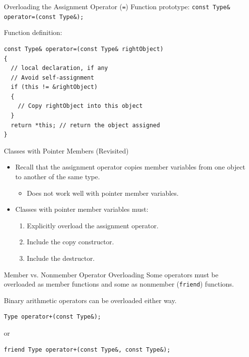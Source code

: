 \documentclass[14pt,aspectratio=1610, hyperref={pdfpagelayout=SinglePage}]{beamer}
\begin{document}
\begin{frame}[fragile]{Overloading the Assignment Operator (\texttt{=})}
\protect\hypertarget{overloading-the-assignment-operator}{}
  Function prototype:
  \lstinline{const Type& operator=(const Type&);}

  Function definition:
  \begin{lstlisting}[basicstyle=\ttfamily\small]
const Type& operator=(const Type& rightObject)
{
  // local declaration, if any
  // Avoid self-assignment
  if (this != &rightObject)
  {
    // Copy rightObject into this object
  }
  return *this; // return the object assigned
}\end{lstlisting}

\end{frame}

\begin{frame}{Classes with Pointer Members (Revisited)}
\begin{itemize}
\item
  Recall that the assignment operator copies member variables from one
  object to another of the same type.
  \begin{itemize}
  \item
    Does not work well with pointer member variables.
  \end{itemize}
\item
  Classes with pointer member variables must:
  \begin{enumerate}
  \item
    Explicitly overload the assignment operator.
  \item
    Include the copy constructor.
  \item
    Include the destructor.
  \end{enumerate}
\end{itemize}
\end{frame}

\begin{frame}[fragile]{Member vs. Nonmember Operator Overloading}
Some operators must be overloaded as member functions and some as nonmember (\lstinline{friend}) functions.

Binary arithmetic operators can be overloaded either way.
  \begin{lstlisting}
Type operator+(const Type&);
\end{lstlisting}
  or
\begin{lstlisting}
friend Type operator+(const Type&, const Type&);
\end{lstlisting}
\end{frame}
\end{document}
